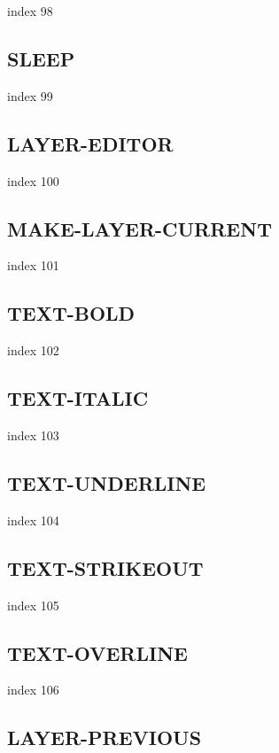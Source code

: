 \documentclass[a4paper]{report}
\begin{document}
{{{{{{{{{{{{{ index 98

\subsection{SLEEP}

index 99

\subsection{LAYER-EDITOR}

index 100

\subsection{MAKE-LAYER-CURRENT}

index 101

\subsection{TEXT-BOLD}

index 102

\subsection{TEXT-ITALIC}

index 103

\subsection{TEXT-UNDERLINE}

index 104

\subsection{TEXT-STRIKEOUT}

index 105

\subsection{TEXT-OVERLINE}

index 106

\subsection{LAYER-PREVIOUS}

}}}}}}}}}}}}}
\end{document}
